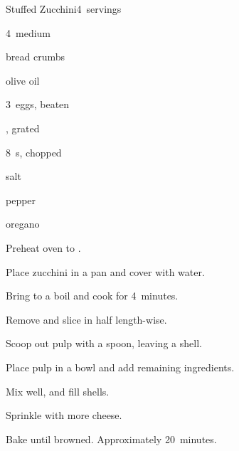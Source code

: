 \begin{recipe}{Stuffed Zucchini}{}{4~servings}

\begin{ingredients}
\item 4~medium 
\item \C{\half} bread crumbs
\item {} olive oil
\item 3~eggs, beaten
\item \C{\half} , grated
\item 8~s, chopped
\item salt
\item pepper
\item oregano
\end{ingredients}

\begin{directions}
\item Preheat oven to .
\item Place zucchini in a pan and cover with water.
\item Bring to a boil and cook for 4~minutes.
\item Remove and slice in half length-wise.
\item Scoop out pulp with a spoon, leaving a shell.
\item Place pulp in a bowl and add remaining ingredients.
\item Mix well, and fill shells.
\item Sprinkle with more cheese.
\item Bake until browned. Approximately 20~minutes.
\end{directions}

\end{recipe}
